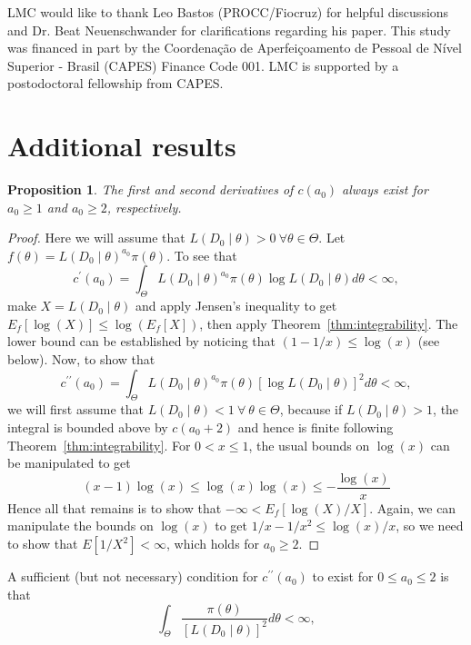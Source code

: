 \documentclass[a4paper, notitlepage, 11pt]{article}
\newtheorem{proposition}{Proposition}[]
\begin{document}
LMC would like to thank Leo Bastos (PROCC/Fiocruz) for helpful discussions and Dr. Beat Neuenschwander for clarifications regarding his paper.
This study was financed in part by the Coordenação de Aperfeiçoamento de Pessoal de Nível Superior - Brasil (CAPES) Finance Code 001.
LMC is supported by a postodoctoral fellowship from CAPES.



\appendix

\section{Additional results}
\label{sec:further_proofs}

\begin{proposition}
\label{prop:c_is_C2}
The first and second derivatives of $c(a_0)$ always exist for $a_0 \geq 1$ and $a_0 \geq 2$, respectively. 
\end{proposition}
\begin{proof}
Here we will assume that $L(D_0 \mid \theta) > 0\: \forall \theta \in \Theta$.
Let $f(\theta) = L(D_0 \mid \theta)^{a_0}\pi(\theta)$.
To see that
\[c^\prime(a_0) = \int_{\Theta} L(D_0\mid\theta)^{a_0} \pi(\theta) \log L(D_0\mid\theta) d\theta < \infty, \]
make $ X = L( D_0 \mid \theta)$ and  apply Jensen's inequality to get $E_f[\log(X)] \leq \log\left(E_f[X]\right)$, then apply Theorem~\ref{thm:integrability}.
The lower bound can be established by noticing that $(1-1/x) \leq \log(x)$ (see below).
Now, to show that 
\[ c^{\prime\prime}(a_0) = \int_{\Theta} L(D_0\mid\theta)^{a_0} \pi(\theta) [\log L(D_0\mid\theta)]^2 d\theta < \infty, \]
we will first assume that $L(D_0 \mid \theta) < 1 \: \forall\: \theta \in \Theta$, because if $L(D_0 \mid \theta) > 1$, the integral is bounded above by $c(a_0 + 2)$ and hence is finite following Theorem~\ref{thm:integrability}.
For $0 < x \leq 1$, the usual bounds on $\log(x)$ can be manipulated to get 
$$ (x-1)\log(x) \leq \log(x)\log(x) \leq - \frac{\log(x)}{x} $$
Hence all that remains is to show that $ - \infty < E_f[\log(X)/X]$.
Again, we can manipulate the bounds on $\log(x)$ to get $1/x - 1/x^2 \leq \log(x)/x$, so we need to show that $E[1/X^2] < \infty$, which holds for $a_0 \geq 2$.
\end{proof}
A sufficient (but not necessary) condition for $c^{\prime\prime}(a_0)$ to exist for $ 0 \leq a_0 \leq 2$ is that 
\[\int_{\Theta} \frac{\pi(\theta)}{[L(D_0\mid\theta)]^2}  d\theta < \infty, \]
\end{document}
